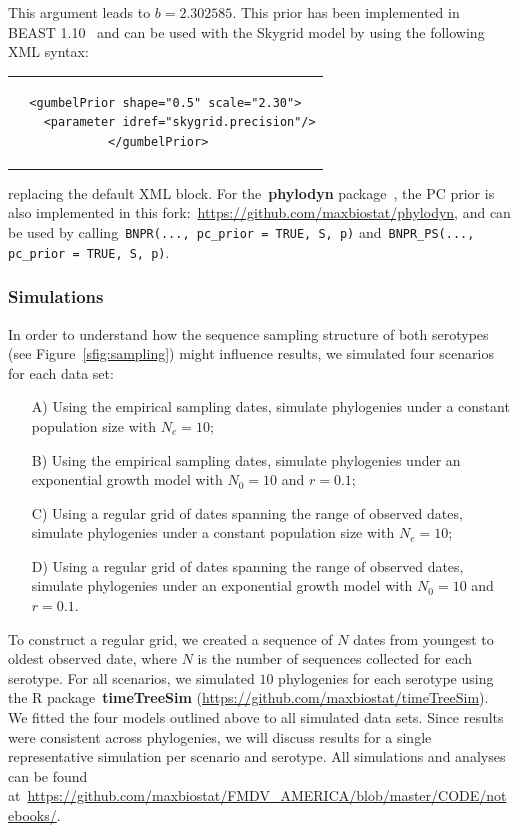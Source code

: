 \documentclass[a4paper,10pt]{article}
\begin{document}
This argument leads to $b = 2.302585$.
This prior has been implemented in BEAST 1.10~\citep{M-Suchard2018} and can be used with the Skygrid model by using the following XML syntax:
\lstset{language=XML}
\begin{center}
\begin{tabular}{c}
\begin{lstlisting}
<gumbelPrior shape="0.5" scale="2.30">
    <parameter idref="skygrid.precision"/>
</gumbelPrior>	
\end{lstlisting}
\end{tabular}
\end{center}
replacing the default XML block.
For the~\textbf{phylodyn} package~\citep{M-Karcher2017}, the PC prior is also implemented in this fork:~\url{https://github.com/maxbiostat/phylodyn}, and can be used by calling~\verb|BNPR(..., pc_prior = TRUE, S, p)| and~\verb|BNPR_PS(..., pc_prior = TRUE, S, p)|.

 
\subsubsection*{Simulations}

In order to understand how the sequence sampling structure of both serotypes (see Figure~\ref{sfig:sampling}) might influence results, we simulated four scenarios for each data set:
\begin{itemize}
 \item[A)] Using the empirical sampling dates, simulate phylogenies under a constant population size with $N_e = 10$;
 \item[B)] Using the empirical sampling dates, simulate phylogenies under an exponential growth model with $N_0 = 10$ and $r = 0.1$;
 \item[C)] Using a regular grid of dates spanning the range of observed dates, simulate phylogenies under a constant population size with $N_e = 10$; %
 \item[D)]  Using a regular grid of dates spanning the range of observed dates, simulate phylogenies under an exponential growth model with $N_0 = 10$ and $r = 0.1$.
\end{itemize}
To construct a regular grid, we created a sequence of $N$ dates from youngest to oldest observed date, where $N$ is the number of sequences collected for each serotype.
For all scenarios, we simulated $10$ phylogenies for each serotype using the R package~\textbf{timeTreeSim} (\url{https://github.com/maxbiostat/timeTreeSim}).
We fitted the four models outlined above to all simulated data sets.
Since results were consistent across phylogenies, we will discuss results for a single representative simulation per scenario and serotype.
All simulations and analyses can be found at~\url{https://github.com/maxbiostat/FMDV_AMERICA/blob/master/CODE/notebooks/}.
\end{document}
